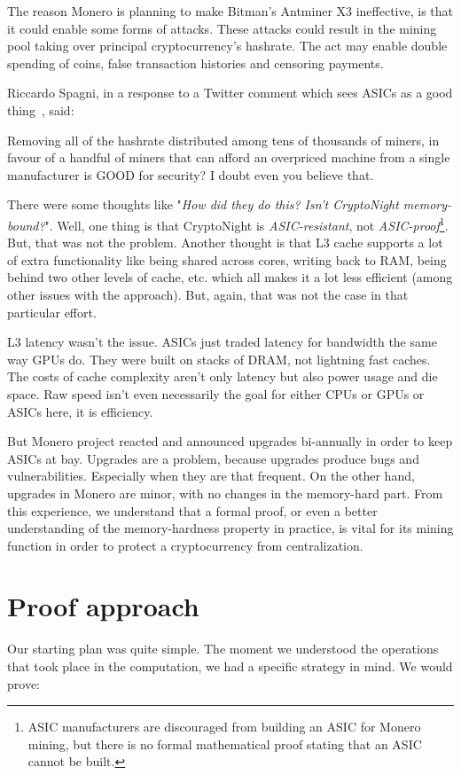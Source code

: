 The reason Monero is planning to make Bitman’s Antminer X3 ineffective, is that it could enable some forms of attacks. These attacks could result in the mining pool taking over principal cryptocurrency’s hashrate. The act may enable double spending of coins, false transaction histories and censoring payments.

Riccardo Spagni, in a response to a Twitter comment which sees ASICs as a good thing~\cite{fluffypony}, said:
\begin{quoting}
  Removing all of the hashrate distributed among tens of
  thousands of miners, in favour of a handful of miners
  that can afford an overpriced machine from a single
  manufacturer is GOOD for security?
  I doubt even you believe that.
\end{quoting}

There were some thoughts like "\emph{How did they do this? Isn't CryptoNight memory-bound?}". Well, one thing is that CryptoNight is \emph{ASIC-resistant}, not \emph{ASIC-proof}\footnote{ASIC manufacturers are discouraged from building an ASIC for Monero mining, but there is no formal mathematical proof stating that an ASIC cannot be built.}. But, that was not the problem. Another thought is that L3 cache supports a lot of extra functionality like being shared across cores, writing back to RAM, being behind two other levels of cache, etc. which all makes it a lot less efficient (among other issues with the approach). But, again, that was not the case in that particular effort.

L3 latency wasn't the issue. ASICs just traded latency for bandwidth the same way GPUs do. They were built on stacks of DRAM, not lightning fast caches. The costs of cache complexity aren't only latency but also power usage and die space. Raw speed isn't even necessarily the goal for either CPUs or GPUs or ASICs here, it is efficiency.

But Monero project reacted and announced upgrades bi-annually in order to keep ASICs at bay. Upgrades are a problem, because upgrades produce bugs and vulnerabilities. Especially when they are that frequent. On the other hand, upgrades in Monero are minor, with no changes in the memory-hard part. From this experience, we understand that a formal proof, or even a better understanding of the memory-hardness property in practice, is vital for its mining function in order to protect a cryptocurrency from centralization.

\section{Proof approach}
Our starting plan was quite simple. The moment we understood the operations that took place in the computation, we had a specific strategy in mind. We would prove:

